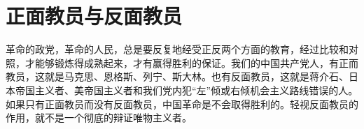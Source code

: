 \section[正面教员与反面教员（一九六五年二月）]{正面教员与反面教员}

革命的政党，革命的人民，总是要反复地经受正反两个方面的教育，经过比较和对照，才能够锻炼得成熟起来，才有赢得胜利的保证。我们的中国共产党人，有正而教员，这就是马克思、恩格斯、列宁、斯大林。也有反面教员，这就是蒋介石、日本帝国主义者、美帝国主义者和我们党内犯“左”倾或右倾机会主义路线错误的人。如果只有正面教员而没有反面教员，中国革命是不会取得胜利的。轻视反面教员的作用，就不是一个彻底的辩证唯物主义者。

